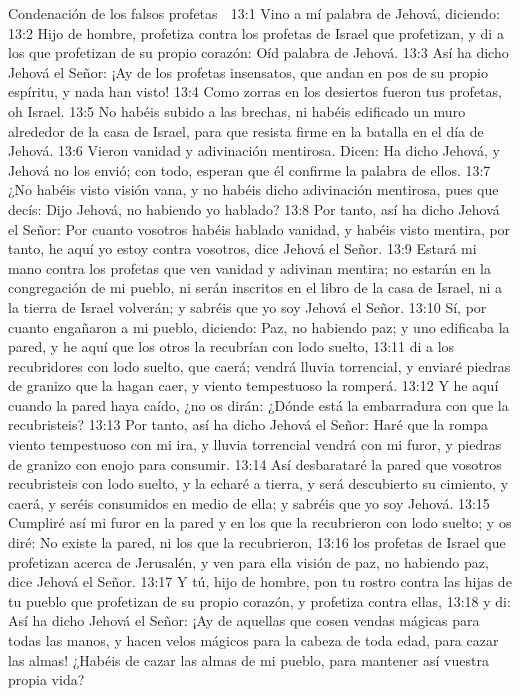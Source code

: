 Condenación de los falsos profetas  

13:1 Vino a mí palabra de Jehová, diciendo:  
13:2 Hijo de hombre, profetiza contra los profetas de Israel que profetizan, y di a los que profetizan de su propio corazón: Oíd palabra de Jehová.  
13:3 Así ha dicho Jehová el Señor: ¡Ay de los profetas insensatos, que andan en pos de su propio espíritu, y nada han visto!  
13:4 Como zorras en los desiertos fueron tus profetas, oh Israel.  
13:5 No habéis subido a las brechas, ni habéis edificado un muro alrededor de la casa de Israel, para que resista firme en la batalla en el día de Jehová.  
13:6 Vieron vanidad y adivinación mentirosa. Dicen: Ha dicho Jehová, y Jehová no los envió; con todo, esperan que él confirme la palabra de ellos.  
13:7 ¿No habéis visto visión vana, y no habéis dicho adivinación mentirosa, pues que decís: Dijo Jehová, no habiendo yo hablado?  
13:8 Por tanto, así ha dicho Jehová el Señor: Por cuanto vosotros habéis hablado vanidad, y habéis visto mentira, por tanto, he aquí yo estoy contra vosotros, dice Jehová el Señor.  
13:9 Estará mi mano contra los profetas que ven vanidad y adivinan mentira; no estarán en la congregación de mi pueblo, ni serán inscritos en el libro de la casa de Israel, ni a la tierra de Israel volverán; y sabréis que yo soy Jehová el Señor.  
13:10 Sí, por cuanto engañaron a mi pueblo, diciendo: Paz, no habiendo paz; y uno edificaba la pared, y he aquí que los otros la recubrían con lodo suelto,  
13:11 di a los recubridores con lodo suelto, que caerá; vendrá lluvia torrencial, y enviaré piedras de granizo que la hagan caer, y viento tempestuoso la romperá.  
13:12 Y he aquí cuando la pared haya caído, ¿no os dirán: ¿Dónde está la embarradura con que la recubristeis?  
13:13 Por tanto, así ha dicho Jehová el Señor: Haré que la rompa viento tempestuoso con mi ira, y lluvia torrencial vendrá con mi furor, y piedras de granizo con enojo para consumir.  
13:14 Así desbarataré la pared que vosotros recubristeis con lodo suelto, y la echaré a tierra, y será descubierto su cimiento, y caerá, y seréis consumidos en medio de ella; y sabréis que yo soy Jehová.  
13:15 Cumpliré así mi furor en la pared y en los que la recubrieron con lodo suelto; y os diré: No existe la pared, ni los que la recubrieron,  
13:16 los profetas de Israel que profetizan acerca de Jerusalén, y ven para ella visión de paz, no habiendo paz, dice Jehová el Señor.  
13:17 Y tú, hijo de hombre, pon tu rostro contra las hijas de tu pueblo que profetizan de su propio corazón, y profetiza contra ellas,  
13:18 y di: Así ha dicho Jehová el Señor: ¡Ay de aquellas que cosen vendas mágicas para todas las manos, y hacen velos mágicos para la cabeza de toda edad, para cazar las almas! ¿Habéis de cazar las almas de mi pueblo, para mantener así vuestra propia vida?  
